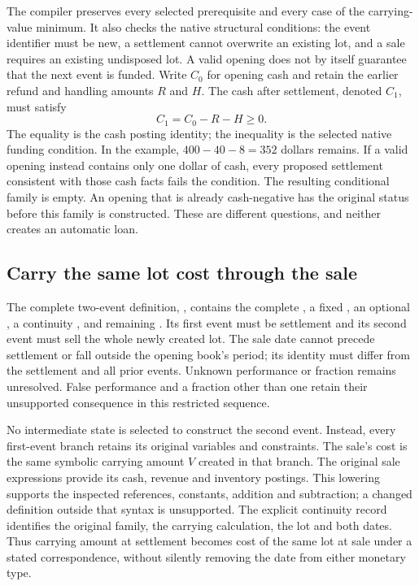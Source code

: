 The compiler preserves every selected prerequisite and every case of the
carrying-value minimum. It also checks the native structural conditions:
the event identifier must be new, a settlement cannot overwrite an existing
lot, and a sale requires an existing undisposed lot. A valid opening does not
by itself guarantee that the next event is funded. Write \(C_0\) for opening
cash and retain the earlier refund and handling amounts \(R\) and \(H\).
The cash after settlement, denoted \(C_1\), must satisfy
\begin{equation}
\label{eq:native-family-funding}
 C_1=C_0-R-H\geq0.
\end{equation}
The equality is the cash posting identity; the inequality is the selected
native funding condition. In the example, \(400-40-8=352\) dollars remains.
If a valid opening instead contains only one dollar of cash, every proposed
settlement consistent with those cash facts fails the condition. The resulting
conditional family is empty. An opening that is already cash-negative has
the original  status before this family is constructed.
These are different questions, and neither creates an automatic loan.

\subsection{Carry the same lot cost through the sale}

The complete two-event definition, ,
contains the complete , a fixed , an optional
, a continuity ,  and
remaining . Its first event must be settlement and its second
event must sell the whole newly created lot. The sale date cannot precede
settlement or fall outside the opening book's period; its identity must differ
from the settlement and all prior events. Unknown performance or fraction
remains unresolved. False performance and a fraction other than one retain
their unsupported consequence in this restricted sequence.

No intermediate state is selected to construct the second event. Instead,
every first-event branch retains its original variables and constraints.
The sale's cost is the same symbolic carrying amount \(V\) created in that
branch. The original sale expressions provide its cash, revenue and inventory
postings. This lowering supports the inspected references, constants, addition
and subtraction; a changed definition outside that syntax is unsupported.
The explicit continuity record identifies the original family, the carrying
calculation, the lot and both dates. Thus carrying amount at settlement becomes
cost of the same lot at sale under a stated correspondence, without silently
removing the date from either monetary type.

